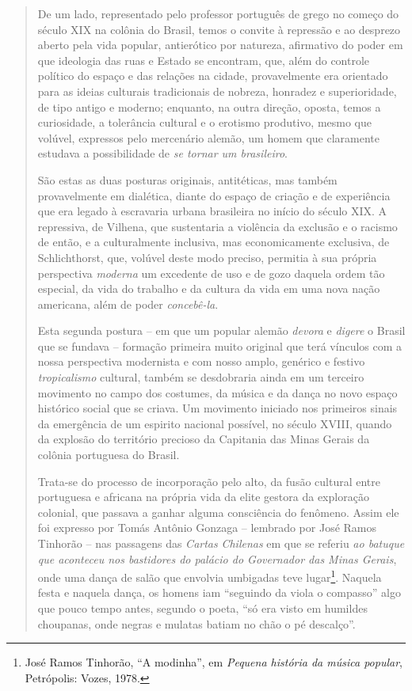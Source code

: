 \begin{quote}
De um lado, representado pelo professor português de grego no começo do
século XIX na colônia do Brasil, temos o convite à repressão e ao
desprezo aberto pela vida popular, antierótico por natureza, afirmativo
do poder em que ideologia das ruas e Estado se encontram, que, além do
controle político do espaço e das relações na cidade, provavelmente era
orientado para as ideias culturais tradicionais de nobreza, honradez e
superioridade, de tipo antigo e moderno; enquanto, na outra direção,
oposta, temos a curiosidade, a tolerância cultural e o erotismo
produtivo, mesmo que volúvel, expressos pelo mercenário alemão, um homem
que claramente estudava a possibilidade de \emph{se tornar um
brasileiro}.

São estas as duas posturas originais, antitéticas, mas também
provavelmente em dialética, diante do espaço de criação e de experiência
que era legado à escravaria urbana brasileira no início do século XIX. A
repressiva, de Vilhena, que sustentaria a violência da exclusão e o
racismo de então, e a culturalmente inclusiva, mas economicamente
exclusiva, de Schlichthorst, que, volúvel deste modo preciso, permitia à
sua própria perspectiva \emph{moderna} um excedente de uso e de gozo
daquela ordem tão especial, da vida do trabalho e da cultura da vida em
uma nova nação americana, além de poder \emph{concebê-la}.

Esta segunda postura -- em que um popular alemão \emph{devora} e
\emph{digere} o Brasil que se fundava -- formação primeira muito
original que terá vínculos com a nossa perspectiva modernista e com
nosso amplo, genérico e festivo \emph{tropicalismo} cultural, também se
desdobraria ainda em um terceiro movimento no campo dos costumes, da
música e da dança no novo espaço histórico social que se criava. Um
movimento iniciado nos primeiros sinais da emergência de um espirito
nacional possível, no século XVIII, quando da explosão do território
precioso da Capitania das Minas Gerais da colônia portuguesa do Brasil.

Trata-se do processo de incorporação pelo alto, da fusão cultural entre
portuguesa e africana na própria vida da elite gestora da exploração
colonial, que passava a ganhar alguma consciência do fenômeno. Assim ele
foi expresso por Tomás Antônio Gonzaga -- lembrado por José Ramos
Tinhorão -- nas passagens das \emph{Cartas} \emph{Chilenas} em que se
referiu \emph{ao batuque que aconteceu nos bastidores do palácio do
Governador das Minas Gerais}, onde uma dança de salão que envolvia
umbigadas teve lugar\footnote{José Ramos Tinhorão, ``A modinha'', em
  \emph{Pequena história da música popular}, Petrópolis: Vozes, 1978.}.
Naquela festa e naquela dança, os homens iam ``seguindo da viola o
compasso'' algo que pouco tempo antes, segundo o poeta, ``só era visto
em humildes choupanas, onde negras e mulatas batiam no chão o pé
descalço''.


\end{quote}
